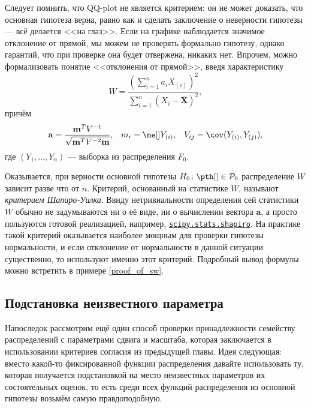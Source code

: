 Следует помнить, что QQ-plot не является критерием: он не может доказать, что основная гипотеза верна, равно как и сделать заключение о неверности гипотезы --- всё делается <<на глаз>>. Если на графике наблюдается значимое отклонение от прямой, мы можем не проверять формально гипотезу, однако гарантий, что при проверке она будет отвержена, никаких нет. Впрочем, можно формализовать понятие <<отклонения от прямой>>, введя характеристику
\begin{equation}\label{sw_statistic}
    W = \frac{\left(\sum_{i=1}^n a_i X_{(i)}\right)^2}{\sum_{i=1}^n (X_i - \overline{\mathbf X})^2},
\end{equation}
причём
$$\mathbf{a} = \frac{\mathbf{m}^TV^{-1}}{\sqrt{\mathbf{m}^T V^{-2}\mathbf{m}}},\;\;\;m_i = \me[] Y_{(i)},\;\;\;V_{ij} = \cov(Y_{(i)}, Y_{(j)}),
$$
где $(Y_1, \ldots, Y_n)$ --- выборка из распределения $F_0$.

Оказывается, при верности основной гипотезы $H_0\colon \pth[] \in \mathcal{P}_0$ распределение $W$ зависит разве что от $n$. Критерий, основанный на статистике $W$, называют \textit{критерием Шапиро-Уилка}. Ввиду нетривиальности определения сей статистики $W$ обычно не задумываются ни о её виде, ни о вычислении вектора $\mathbf{a}$, а просто пользуются готовой реализацией, например, \href{https://docs.scipy.org/doc/scipy/reference/generated/scipy.stats.shapiro.html}{\texttt{scipy.stats.shapiro}}. На практике такой критерий оказывается наиболее мощным для проверки гипотезы нормальности, и если отклонение от нормальности в данной ситуации существенно, то используют именно этот критерий. Подробный вывод формулы можно встретить в примере \ref{proof_of_sw}.

\subsection{Подстановка неизвестного параметра}

Напоследок рассмотрим ещё один способ проверки принадлежности семейству распределений с параметрами сдвига и масштаба, которая заключается в использовании критериев согласия из предыдущей главы. Идея следующая: вместо какой-то фиксированной функции распределения давайте использовать ту, которая получается подстановкой на место неизвестных параметров их состоятельных оценок, то есть среди всех функций распределения из основной гипотезы возьмём самую правдоподобную. 

